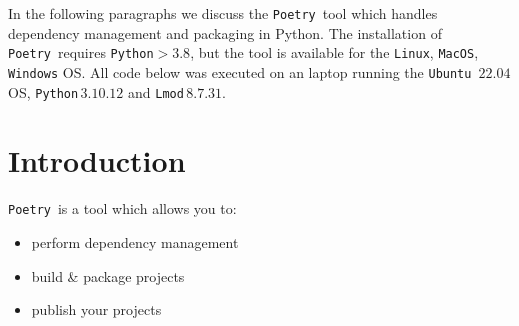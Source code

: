 \documentclass[10pt]{article}
\newcommand{\POETRY}{\texttt{Poetry}}
\begin{document}
\title{}
\author{Wim R.M. Cardoen, PhD \\ Email: \$(prefix)[at]gmail[dot]com \\ where \\ prefix='wcardoen' }
\date{\today}
\maketitle
\thispagestyle{empty}
\pagestyle{plain}
\setcounter{page}{1}
\renewcommand \thesection{\Roman{section}} 

In the following paragraphs we discuss the \POETRY\ tool \cite{POETRY:2023} which handles
dependency management and packaging in Python. The installation of \POETRY\ requires \texttt{Python}$>3.8$, 
but the tool is available for the \texttt{Linux}, \texttt{MacOS}, \texttt{Windows} OS.
All code below was executed on an laptop running the \texttt{Ubuntu $22.04$} OS, \texttt{Python}\,$3.10.12$ 
and \texttt{Lmod}\,$8.7.31$.

\section*{Introduction}
\POETRY\ is a tool which allows you to:
\begin{itemize}
	\item perform dependency management
        \item build \& package projects
        \item publish your projects		
\end{itemize}		
\end{document}

